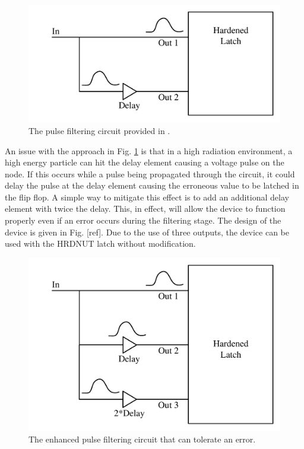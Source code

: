\begin{figure}[!htbp]
	\centering
	\includegraphics[width=0.65\linewidth]{Figures/PulseFilter}
	\caption{The pulse filtering circuit provided in \cite{FERST}.}
	\label{P_filter}
\end{figure}

An issue with the approach in Fig. \ref{P_filter} is that in a high radiation environment, a high energy particle can hit the delay element causing a voltage pulse on the node. If this occurs while a pulse being propagated through the circuit, it could delay the pulse at the delay element causing the erroneous value to be latched in the flip flop. A simple way to mitigate this effect is to add an additional delay element with twice the delay. This, in effect, will allow the device to function properly even if an error occurs during the filtering stage. The design of the device is given in Fig. [ref]. Due to the use of three outputs, the device can be used with the HRDNUT latch without modification.

\begin{figure}[!htbp]
	\centering
	\includegraphics[width=0.65\linewidth]{Figures/PulseFilterEnh}
	\caption{The enhanced pulse filtering circuit that can tolerate an error.}
	\label{Enh_filter}
\end{figure} 

